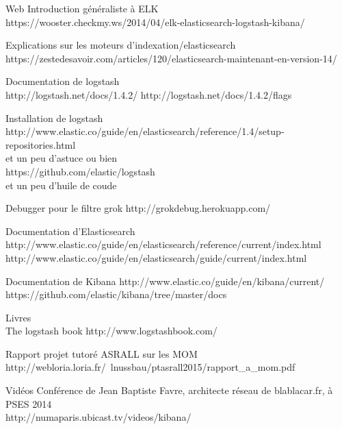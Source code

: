 Web
Introduction généraliste à ELK \\

https://wooster.checkmy.ws/2014/04/elk-elasticsearch-logstash-kibana/

Explications sur les moteurs d'indexation/elasticsearch\\
https://zestedesavoir.com/articles/120/elasticsearch-maintenant-en-version-14/



Documentation de logstash\\
http://logstash.net/docs/1.4.2/
http://logstash.net/docs/1.4.2/flags

Installation de logstash
http://www.elastic.co/guide/en/elasticsearch/reference/1.4/setup-repositories.html
\\ et un peu d'astuce ou bien \\
https://github.com/elastic/logstash
\\ et un peu d'huile de coude


Debugger pour le filtre grok
http://grokdebug.herokuapp.com/


Documentation d'Elasticsearch\\
http://www.elastic.co/guide/en/elasticsearch/reference/current/index.html\\
http://www.elastic.co/guide/en/elasticsearch/guide/current/index.html



Documentation de Kibana
http://www.elastic.co/guide/en/kibana/current/
https://github.com/elastic/kibana/tree/master/docs


Livres\\
The logstash book
http://www.logstashbook.com/

Rapport projet tutoré ASRALL sur les MOM
http://webloria.loria.fr/~lnussbau/ptasrall2015/rapport_a_mom.pdf


Vidéos
Conférence de Jean Baptiste Favre, architecte réseau de blablacar.fr, à PSES 2014\\
http://numaparis.ubicast.tv/videos/kibana/
